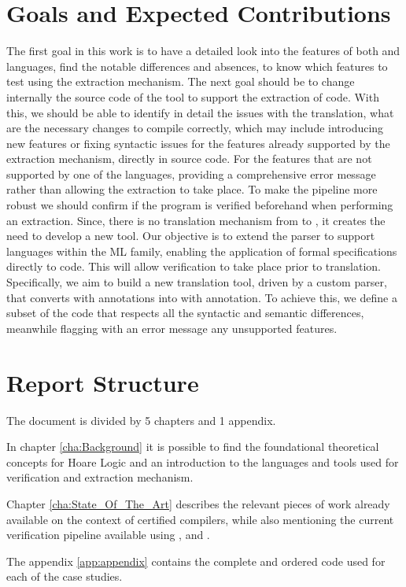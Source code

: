 \section{Goals and Expected Contributions}
\label{sec:Goals_and_Expected_Contributions}

The first goal in this work is to have a detailed look into the features of both \ocaml and \cml languages, find the notable 
differences and absences, to know which features to test using the extraction mechanism. The next goal should be to change 
internally the source code of the \cameleer tool to support the extraction of \cml code. With this, we should be able to identify
in detail the issues with the translation, what are the necessary changes to compile correctly, which may include introducing new features
or fixing syntactic issues for the features already supported by the extraction mechanism, directly in \whythree source code.
For the features that are not supported by one of the languages, providing a comprehensive error message rather than allowing 
the extraction to take place. To make the pipeline more robust we should confirm if the program is verified beforehand when performing 
an extraction. Since, there is no translation mechanism from \cml to \ocaml, it creates the need to develop a new tool. Our objective is 
to extend the \gospel parser to support languages within the ML family, enabling the application of formal specifications directly to 
\cml code. This will allow verification to take place prior to translation. Specifically, we aim to build a new translation tool, 
driven by a custom parser, that converts \cml with \gospel annotations into \ocaml with \gospel annotation. To achieve this, we define
a subset of the \cml code that respects all the syntactic and semantic differences, meanwhile flagging with an error message any 
unsupported features.

\section{Report Structure}
\label{sec:Report_Structure}

The document is divided by 5 chapters and 1 appendix. 

In chapter \ref{cha:Background} it is possible to find the foundational theoretical concepts for Hoare Logic and an introduction to 
the languages and tools used for verification and extraction mechanism.

Chapter \ref{cha:State_Of_The_Art} describes the relevant pieces of work already available on the context of certified compilers, 
while also mentioning the current verification pipeline available using \cameleer, \whythree and \cml. 



The appendix \ref{app:appendix} contains the complete and ordered code used for each of the case studies.